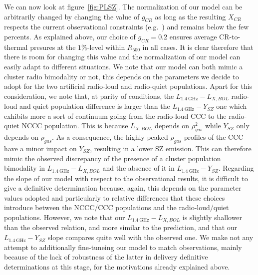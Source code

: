 \documentclass[traditabstract]{aa}
\newcommand{\rmn}{\mathrm}
\begin{document}
We can now look at figure~\ref{fig:PLSZ}. The normalization of our model can be arbitrarily changed by changing the value of $g_{CR}$ as long as the resulting $X_{CR}$ respects the current observational constraints (e.g.~\citealp{2011arXiv1111.5544M}) and remains below the few percents. As explained above, our choice of $g_{CR}=0.2$ ensures average CR-to-thermal presures at the $1\%$-level within $R_{500}$ in all cases. It is clear therefore that there is room for changing this value and the normalization of our model can easily adapt to different situations. We note that our model can both mimic a cluster radio bimodality or not, this depends on the parameters we decide to adopt for the two artificial radio-loud and radio-quiet populations. Apart for this consideration, we note that, at parity of conditions, the $L_{1.4~\rmn{GHz}}-L_{X, BOL}$ radio-loud and quiet population difference is larger than the $L_{1.4~\rmn{GHz}}-Y_{SZ}$ one which exhibits more a sort of continuum going from the radio-loud CCC to the radio-quiet NCCC population. This is because $L_{X, BOL}$ depends on $\rho_{gas}^2$ while $Y_{SZ}$ only depends on $\rho_{gas}$. As a consequence, the highly peaked $\rho_{gas}$ profiles of the CCC have a minor impact on $Y_{SZ}$, resulting in a lower SZ emission. This can therefore mimic the observed discrepancy of the presence of a cluster population bimodality  in $L_{1.4~\rmn{GHz}}-L_{X, BOL}$ and the absence of it in $L_{1.4~\rmn{GHz}}-Y_{SZ}$. Regarding the slope of our model with respect to the observational results, it is difficult to give a definitive determination because, again, this depends on the parameter values adopted and particularly to relative differences that these choices introduce between the NCCC/CCC populations and the radio-loud/quiet populations. However, we note that our $L_{1.4~\rmn{GHz}}-L_{X, BOL}$ is slightly shallower than the observed relation, and more similar to the \cite{2009JCAP...09..024K} prediction, and that our $L_{1.4~\rmn{GHz}}-Y_{SZ}$ slope compares quite well with the observed one. We make not any attempt to additionally fine-tuneing our model to match observations, mainly because of the lack of robustness of the latter in delivery definitive determinations at this stage, for the motivations already explained above. 
\end{document}
